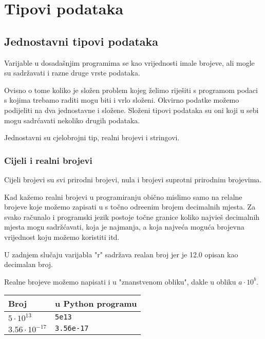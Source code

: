 \chapter{Tipovi podataka}

\section{Jednostavni tipovi podataka}

	Varijable u dosada\v{s}njim programima se kao vrijednosti imale brojeve, ali
	mogle su sadr\v{z}avati i razne druge vrste podataka.

	Ovisno o tome koliko je slo\v{z}en problem kojeg \v{z}elimo rije\v{s}iti s
	programom podaci s kojima trebamo raditi mogu biti i vrlo slo\v{z}eni. Okvirno
	podatke mo\v{z}emo podijeliti na dva jednostavne i slo\v{z}ene. Slo\v{z}eni tipovi
	podataka su oni koji u sebi mogu sadr\'{c}avati nekoliko drugih podataka.

	Jednostavni su cjelobrojni tip, realni brojevi i stringovi.

\subsection{Cijeli i realni brojevi}

	Cijeli brojevi su svi prirodni brojevi, nula i brojevi suprotni prirodnim
	brojevima.

	Kad ka\v{z}emo realni brojevi u programiranju obi\v{c}no mislimo samo na relalne
	brojeve koje mo\v{z}emo zapisati u s to\v{c}no odre\dj{}enim brojem decimalnih
	mjesta. Za svako ra\v{c}unalo i programski jezik postoje to\v{c}ne granice koliko
	najvie\v{s} decimalnih mjesta mogu sadr\v{z}\'{c}avati, koja je najmanja, a koja
	najve\'{c}a mogu\'{c}a brojevna vrijednost koju mo\v{z}emo koristiti itd.


	U zadnjem slu\v{c}aju varijabla "r" sadr\v{z}ava realan broj jer je 12.0
	opisan kao decimalan broj. 

	Realne brojeve mo\v{z}emo napisati i u "znanstvenom obliku", dakle u obliku $a\cdot
	10^{b}$.

	\vspace{3mm}
	\begin{tabular}{l|l}
		Broj & u Python programu\\
		\hline
		$5\cdot 10^{13}$ & \verb+5e13+\\
		$3.56\cdot 10^{-17}$ & \verb+3.56e-17+\\
	\end{tabular}
	\vspace{3mm}

